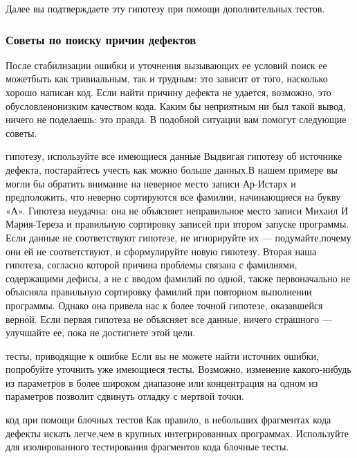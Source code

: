\documentclass[a4paper]{article}
\begin{document}
Далее  вы  подтверждаете  эту  гипотезу  при  помощи  дополнительных  тестов.

\subsubsection{Советы по поиску причин дефектов}

После стабилизации ошибки и уточнения вызывающих ее условий поиск ее можетбыть  как  тривиальным,  так  и  трудным:  это  зависит  от  того,  насколько  хорошо  написан  код.  Если  найти  причину  дефекта  не  удается,  возможно,  это  обусловленонизким  качеством  кода.  Каким  бы  неприятным  ни  был  такой  вывод,  ничего  не  поделаешь:  это  правда.  В  подобной  ситуации  вам  помогут  следующие  советы.

{  гипотезу,  используйте  все  имеющиеся  данные} Выдвигая  гипотезу  об  источнике  дефекта,  постарайтесь  учесть  как  можно  больше  данных.В нашем примере вы могли бы обратить внимание на неверное место записи Ар-Истарх  и  предположить,  что  неверно  сортируются  все  фамилии,  начинающиеся на букву «А». Гипотеза неудачна: она не объясняет неправильное место записи Михаил И Мария-Тереза  и  правильную  сортировку  записей  при  втором  запуске  программы.  Если  данные  не  соответствуют  гипотезе,  не  игнорируйте  их  —  подумайте,почему  они  ей  не  соответствуют,  и  сформулируйте  новую  гипотезу. Вторая  наша  гипотеза,  согласно  которой  причина  проблемы  связана  с  фамилиями,  содержащими  дефисы,  а  не  с  вводом  фамилий  по  одной,  также  первоначально  не  объясняла  правильную  сортировку  фамилий  при  повторном  выполнении программы.  Однако  она  привела  нас  к  более  точной  гипотезе,  оказавшейся  верной.  Если  первая  гипотеза  не  объясняет  все  данные,  ничего  страшного  —  улучшайте  ее,  пока  не  достигнете  этой  цели.

{ тесты, приводящие к ошибке} Если вы не можете найти источник  ошибки,  попробуйте  уточнить  уже  имеющиеся  тесты.  Возможно,  изменение  какого-нибудь  из  параметров  в  более  широком  диапазоне  или  концентрация на  одном  из  параметров  позволит  сдвинуть  отладку  с  мертвой  точки.

{ код при помощи блочных тестов} Как правило,  в  небольших  фрагментах  кода  дефекты  искать  легче,чем  в  крупных  интегрированных  программах.  Используйте для изолированного тестирования фрагментов кода блочные  тесты.
\end{document}

